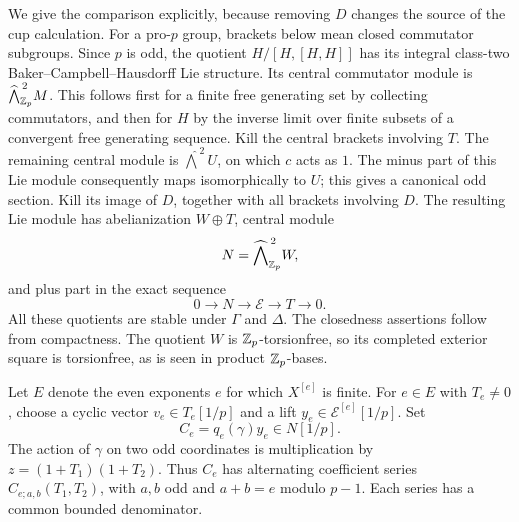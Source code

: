 We give the comparison explicitly, because removing $D$ changes
the source of the cup calculation.
For a pro-$p$ group, brackets below mean closed commutator
subgroups. Since $p$ is odd, the quotient $H/[H,[H,H]]$
has its integral class-two Baker--Campbell--Hausdorff Lie
structure. Its central commutator module is
$\widehat{\bigwedge}^{\,2}_{\mathbb Z_p}M$. This follows first for a
finite free generating set by collecting commutators, and then
for $H$ by the inverse limit over finite subsets of a convergent
free generating sequence. Kill the central brackets involving
$T$. The remaining central module is
$\widehat{\bigwedge}^{\,2}U$, on which $c$ acts as $1$.
The minus part of this Lie module consequently maps
isomorphically to $U$; this gives a canonical odd section.
Kill its image of $D$, together with all brackets involving
$D$. The resulting Lie module has abelianization $W\oplus T$,
central module
\[
                   N=\widehat{\bigwedge}^{\,2}_{\mathbb Z_p}W,
\]
and plus part in the exact sequence
\begin{equation}
             0\longrightarrow N\longrightarrow \mathcal E
              \longrightarrow T\longrightarrow0 .
             \label{eq:projectedextension}
\end{equation}
All these quotients are stable under $\Gamma$ and $\Delta$.
The closedness assertions follow from compactness. The quotient
$W$ is $\mathbb Z_p$-torsionfree, so its completed exterior square
is torsionfree, as is seen in product $\mathbb Z_p$-bases.

Let $E$ denote the even exponents $e$ for which $X^{[e]}$
is finite. For $e\in E$ with $T_e\ne0$, choose a cyclic vector
$v_e\in T_e[1/p]$ and a lift $y_e\in\mathcal E^{[e]}[1/p]$.
Set
\begin{equation}
                C_e=q_e(\gamma)y_e\in N[1/p].
                \label{eq:projectedcompanion}
\end{equation}
The action of $\gamma$ on two odd coordinates is multiplication
by $z=(1+T_1)(1+T_2)$. Thus $C_e$ has alternating coefficient
series $C_{e;a,b}(T_1,T_2)$, with $a,b$ odd and
$a+b=e$ modulo $p-1$. Each series has a common bounded
denominator.

